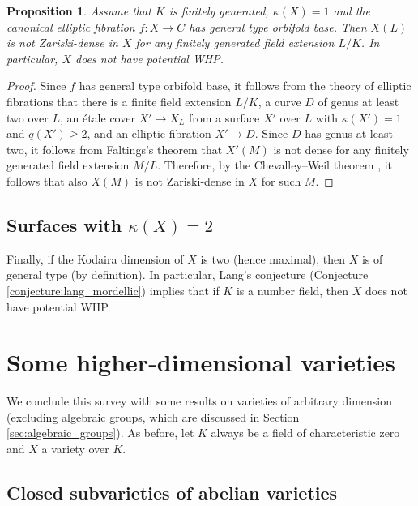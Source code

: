 \documentclass[10pt,a4paper]{amsart}
\theoremstyle{plain}
\newtheorem{proposition}[theorem]{Proposition}
\theoremstyle{remark}
\numberwithin{theorem}{section}
\begin{document}
\begin{proposition}\label{thm:general_type_orbifold_base}
 Assume that
$K$ is finitely generated, $\kappa(X)=1$
and the canonical elliptic fibration $f\colon X\to C$ has general type orbifold base.
Then $X(L)$ is not Zariski-dense in $X$ for any finitely generated field extension $L/K$.
 In particular, $X$ does not have potential WHP. 
\end{proposition}
\begin{proof}
     Since $f$ has general type orbifold base, it follows from the theory of elliptic fibrations \cite[Lemma~3.34]{Ca04} that there is  a finite field extension $L/K$,  a curve $D$ of genus at least two over $L$,   an \'etale cover $X'\to X_L$ from a surface $X'$ over $L$ with $\kappa(X')=1$ and $q(X') \geq 2$, and an elliptic fibration $X'\to D$. 
     Since $D$ has genus at least two, it follows from Faltings's theorem \cite{Faltings} that $X'(M)$ is not dense for any finitely generated field extension $M/L$. Therefore, by the Chevalley--Weil theorem \cite[Theorem~3.8]{CDJLZ}, it follows that 
       also $X(M)$ is not Zariski-dense in $X$ for such $M$.
\end{proof}
 
 
\subsection{Surfaces with  $\kappa(X)=2$}

Finally, if the Kodaira dimension of $X$ is two (hence maximal), then $X$ is of general type (by definition). In particular,   
Lang's conjecture (Conjecture \ref{conjecture:lang_mordellic}) implies that
if $K$ is a number field, then $X$ does not have potential WHP.  


\section{Some higher-dimensional varieties}
\label{sec:higher_dim}

\noindent
We conclude this survey with some results on varieties of arbitrary dimension (excluding algebraic groups, which are discussed in Section \ref{sec:algebraic_groups}).
As before, let $K$ always be a field of characteristic zero
and $X$ a variety over $K$.

\subsection{Closed subvarieties of abelian varieties}
\end{document}

